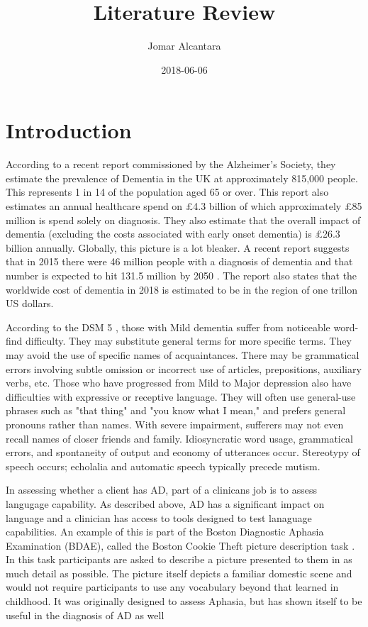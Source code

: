 \documentclass[a4paper]{article}
\title{Literature Review}
\date{2018-06-06}
\author{Jomar Alcantara}
\begin{document}
\maketitle
\newpage
\tableofcontents
\newpage
\section{Introduction}
\par
According to a recent report commissioned by the Alzheimer's Society, they estimate the prevalence of Dementia in the UK at approximately 815,000 people. This represents 1 in 14 of the population aged 65 or over. This report also estimates an annual healthcare spend on £4.3 billion of which approximately £85 million is spend solely on diagnosis. They also estimate that the overall impact of dementia (excluding the costs associated with early onset dementia) is £26.3 billion annually. Globally, this picture is a lot bleaker. A recent report suggests that in 2015 there were 46 million people with a diagnosis of dementia and that number is expected to hit 131.5 million by 2050 \cite{Prince2015}. The report also states that the worldwide cost of dementia in 2018 is estimated to be in the region of one trillon US dollars. \newline
\par
According to the DSM 5 \cite{AmericanPsychiatricAssociation2013}, those with Mild dementia suffer from noticeable word-find difficulty. They may substitute general terms for more specific terms. They may avoid the use of specific names of acquaintances. There may be grammatical errors involving subtle omission or incorrect use of articles, prepositions, auxiliary verbs, etc. Those who have progressed from Mild to Major depression also have difficulties with expressive or receptive language. They will often use general-use phrases such as "that thing" and "you know what I mean," and prefers general pronouns rather than names. With severe impairment, sufferers may not even recall names of closer friends and family. Idiosyncratic word usage, grammatical errors, and spontaneity of output and economy of utterances occur. Stereotypy of speech occurs; echolalia and automatic speech typically precede mutism.\newline
\par
In assessing whether a client has AD, part of a clinicans job is to assess langugage capability. As described above, AD has a significant impact on language and a clinician has access to tools designed to test lanaguage capabilities. An example of this is part of the Boston Diagnostic Aphasia Examination (BDAE), called the Boston Cookie Theft picture description task \cite{} . In this task participants are asked to describe a picture presented to them in as much detail as possible. The picture itself depicts a familiar domestic scene and would not require participants to use any vocabulary beyond that learned in childhood. It was originally designed to assess Aphasia, but has shown itself to be useful in the diagnosis of AD as well \cite{GilesPattersonHodges1995}\newline
\end{document}
